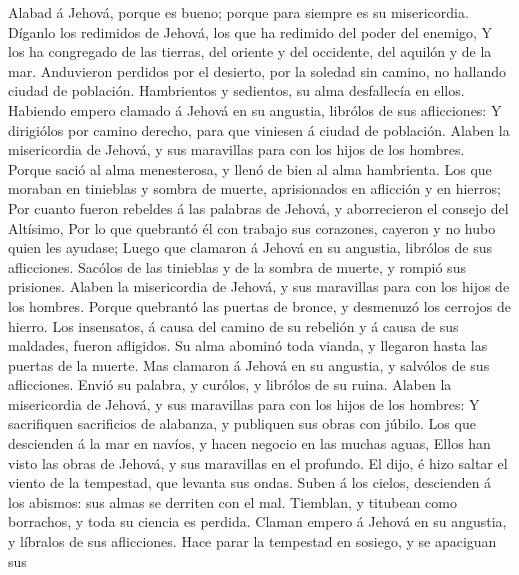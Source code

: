  Alabad á Jehová, porque es bueno; porque para siempre es su
misericordia.  Díganlo los redimidos de Jehová, los que ha
redimido del poder del enemigo,  Y los ha congregado de las
tierras, del oriente y del occidente, del aquilón y de la mar.
 Anduvieron perdidos por el desierto, por la soledad sin
camino, no hallando ciudad de población.  Hambrientos y
sedientos, su alma desfallecía en ellos.  Habiendo empero
clamado á Jehová en su angustia, librólos de sus aflicciones:
 Y dirigiólos por camino derecho, para que viniesen á ciudad
de población.  Alaben la misericordia de Jehová, y sus
maravillas para con los hijos de los hombres.  Porque sació
al alma menesterosa, y llenó de bien al alma hambrienta. 
Los que moraban en tinieblas y sombra de muerte, aprisionados en
aflicción y en hierros;  Por cuanto fueron rebeldes á las
palabras de Jehová, y aborrecieron el consejo del Altísimo,
 Por lo que quebrantó él con trabajo sus corazones, cayeron
y no hubo quien les ayudase;  Luego que clamaron á Jehová
en su angustia, librólos de sus aflicciones.  Sacólos de
las tinieblas y de la sombra de muerte, y rompió sus prisiones.
 Alaben la misericordia de Jehová, y sus maravillas para
con los hijos de los hombres.  Porque quebrantó las puertas
de bronce, y desmenuzó los cerrojos de hierro.  Los
insensatos, á causa del camino de su rebelión y á causa de sus maldades,
fueron afligidos.  Su alma abominó toda vianda, y llegaron
hasta las puertas de la muerte.  Mas clamaron á Jehová en
su angustia, y salvólos de sus aflicciones.  Envió su
palabra, y curólos, y librólos de su ruina.  Alaben la
misericordia de Jehová, y sus maravillas para con los hijos de los
hombres:  Y sacrifiquen sacrificios de alabanza, y
publiquen sus obras con júbilo.  Los que descienden á la
mar en navíos, y hacen negocio en las muchas aguas,  Ellos
han visto las obras de Jehová, y sus maravillas en el profundo.
 El dijo, é hizo saltar el viento de la tempestad, que
levanta sus ondas.  Suben á los cielos, descienden á los
abismos: sus almas se derriten con el mal.  Tiemblan, y
titubean como borrachos, y toda su ciencia es perdida. 
Claman empero á Jehová en su angustia, y líbralos de sus aflicciones.
 Hace parar la tempestad en sosiego, y se apaciguan sus
